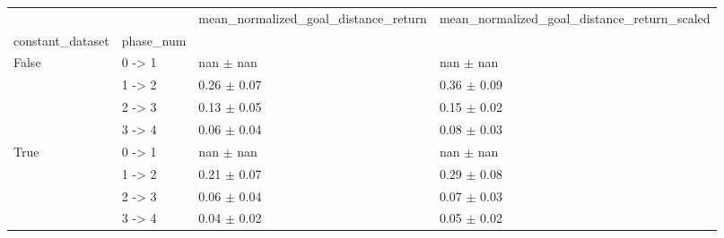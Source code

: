 \begin{tabular}{llll}
\toprule
 &  & mean_normalized_goal_distance_return & mean_normalized_goal_distance_return_scaled \\
constant_dataset & phase_num &  &  \\
\midrule
\multirow[t]{4}{*}{False} & 0 -> 1 & nan $\pm$ nan & nan $\pm$ nan \\
 & 1 -> 2 & 0.26 $\pm$ 0.07 & 0.36 $\pm$ 0.09 \\
 & 2 -> 3 & 0.13 $\pm$ 0.05 & 0.15 $\pm$ 0.02 \\
 & 3 -> 4 & 0.06 $\pm$ 0.04 & 0.08 $\pm$ 0.03 \\
\cline{1-4}
\multirow[t]{4}{*}{True} & 0 -> 1 & nan $\pm$ nan & nan $\pm$ nan \\
 & 1 -> 2 & 0.21 $\pm$ 0.07 & 0.29 $\pm$ 0.08 \\
 & 2 -> 3 & 0.06 $\pm$ 0.04 & 0.07 $\pm$ 0.03 \\
 & 3 -> 4 & 0.04 $\pm$ 0.02 & 0.05 $\pm$ 0.02 \\
\cline{1-4}
\bottomrule
\end{tabular}
